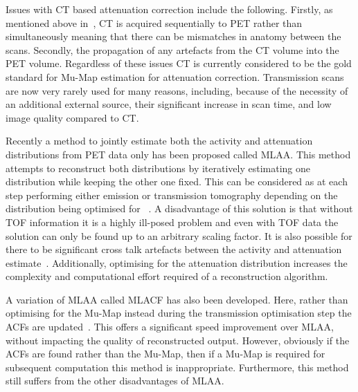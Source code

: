                 Issues with \gls{CT} based attenuation correction include the following. Firstly, as mentioned above in~, \gls{CT} is acquired sequentially to \gls{PET} rather than simultaneously meaning that there can be mismatches in anatomy between the scans. Secondly, the propagation of any artefacts from the \gls{CT} volume into the \gls{PET} volume. Regardless of these issues \gls{CT} is currently considered to be the gold standard for \gls{Mu-Map} estimation for attenuation correction. Transmission scans are now very rarely used for many reasons, including, because of the necessity of an additional external source, their significant increase in scan time, and low image quality compared to \gls{CT}. 
                
                Recently a method to jointly estimate both the activity and attenuation distributions from \gls{PET} data only has been proposed called \gls{MLAA}. This method attempts to reconstruct both distributions by iteratively estimating one distribution while keeping the other one fixed. This can be considered as at each step performing either emission or transmission tomography depending on the distribution being optimised for%
                ~\parencite{Fuin2017, Brusaferri2020JointPET}. A disadvantage of this solution is that without \gls{TOF} information it is a highly ill-posed problem and even with \gls{TOF} data the solution can only be found up to an arbitrary scaling factor. It is also possible for there to be significant cross talk artefacts between the activity and attenuation estimate~\parencite{MLAASalomonBib, MLAADefriseBib}. Additionally, optimising for the attenuation distribution increases the complexity and computational effort required of a reconstruction algorithm.

                A variation of \gls{MLAA} called \gls{MLACF} has also been developed. Here, rather than optimising for the \gls{Mu-Map} instead during the transmission optimisation step the \glspl{ACF} are updated~\parencite{Nuyts2012ML-reconstructionFactors}. This offers a significant speed improvement over \gls{MLAA}, without impacting the quality of reconstructed output. However, obviously if the \glspl{ACF} are found rather than the \gls{Mu-Map}, then if a \gls{Mu-Map} is required for subsequent computation this method is inappropriate. Furthermore, this method still suffers from the other disadvantages of \gls{MLAA}.
                
